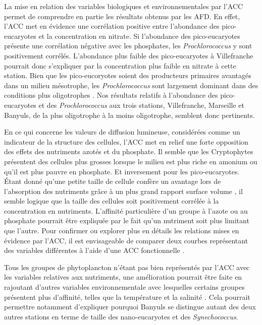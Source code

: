 \documentclass[12pt]{article}
\begin{document}
La mise en relation des variables biologiques et environnementales par l’ACC permet de comprendre en partie les résultats obtenus par les AFD. En effet, l’ACC met en évidence une corrélation positive entre l’abondance des pico-eucaryotes et la concentration en nitrate.  Si l’abondance des pico-eucaryotes présente une corrélation négative avec les phosphates, les \textit{Prochlorococcus} y sont positivement corrélés. L’abondance plus faible des pico-eucaryotes à Villefranche pourrait donc s’expliquer par la concentration plus faible en nitrate à cette station. Bien que les pico-eucoryotes soient des producteurs primaires avantagés dans un milieu mésotrophe, les \textit{Prochlorococcus} sont largement dominant dans des conditions plus oligotrophes \citep{Zubkov2000, Pan2021}. Nos résultats relatifs à l’abondance des pico-eucaryotes et des \textit{Prochlorococcus} aux trois stations, Villefranche, Marseille et Banyuls, de la plus oligotrophe à la moins oligotrophe, semblent donc pertinents. 

En ce qui concerne les valeurs de diffusion lumineuse, considérées comme un indicateur de la structure des cellules,  l’ACC met en relief une forte opposition des effets des nutriments azotés et du phosphate. Il semble que les Cryptophytes présentent des cellules plus grosses lorsque le milieu est plus riche en amonium ou qu’il est plus pauvre en phosphate. Et inversement pour les pico-eucaryotes. Étant donné qu’une petite taille de cellule confère un avantage lors de l’absorption des nutriments grâce à un plus grand rapport surface volume \citep{Litchman2008}, il semble logique que la taille des cellules soit positivement corrélée à la concentration en nutriments. L’affinité particulière d’un groupe à l’azote ou au phosphate pourrait être expliquée par le fait qu’un nutriment soit plus limitant que l’autre. 
Pour confirmer ou explorer plus en détails les relations mises en évidence par l’ACC, il est envisageable de comparer deux courbes représentant des variables différentes à l’aide d’une ACC fonctionnelle \citep{Ramsay1998}.      

Tous les groupes de phytoplancton n’étant pas bien représentés par l’ACC avec les variables relatives aux nutriments, une amélioration pourrait être faite en rajoutant d’autres variables environnementale avec lesquelles certains groupes présentent plus d'affinité,  telles que la température et la salinité \citep{Zubcov200}. Cela pourrait permettre notamment d’expliquer pourquoi Banyuls se distingue autant des deux autres stations en terme de taille des nano-eucaryotes et des \textit{Synechococcus}. 
\end{document}
